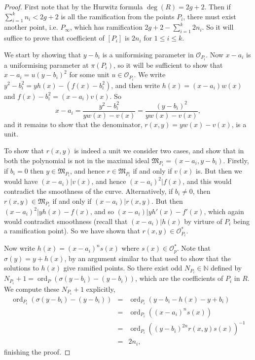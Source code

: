 \documentclass[11pt]{article} %
\theoremstyle{remark}\newtheorem*{rem}{Remark}
\DeclareMathOperator{\ord}{ord}
\begin{document}
\begin{proof}
 First note that by the Hurwitz formula $\deg(R) = 2g+2$.
 Then if $\sum_{i=1}^k n_i < 2g+2$ is all the ramification from the points $P_i$, there must exist another point, i.e. $P_{\infty}$, which has ramification $2g+2-\sum _{i=1}^k2n_i$.
 So it will suffice to prove that coefficient of $[P_i]$ is $2n_i$ for $1\leq i \leq k$.
 
 We start by showing that $y-b_i$ is a uniformising parameter in $\mathscr O_{P_i}$.
 Now $x-a_i$ is a uniformising parameter at $\pi(P_i)$, so it will be sufficient to show that $x-a_i = u(y-b_i)^2$ for some unit $u\in \mathscr O_{P_i}$.
 We write $y^2-b_i^2 = yh(x)-(f(x)-b_i^2)$, and then write $h(x)=(x-a_i)w(x)$ and $f(x)-b_i^2=(x-a_i)v(x)$.
 So 
 \[
x-a_i = \frac{y^2-b_i^2}{yw(x)-v(x)} = \frac{(y-b_i)^2}{yw(x)-v(x)},
 \]
and it remains to show that the denominator, $r(x,y) = yw(x)-v(x)$, is a unit.

To show that $r(x,y)$ is indeed a unit we consider two cases, and show that in both the polynomial is not in the maximal ideal $\mathfrak M_{P_i}=(x-a_i,y-b_i)$.
Firstly, if $b_i=0$ then $y\in \mathfrak{M}_{P_i}$, and hence $r\in \mathfrak M_{P_i}$ if and only if $v(x)$ is.
But then we would have $(x-a_i)|v(x)$, and hence $(x-a_i)^2|f(x)$, and this would contradict the smoothness of the curve.
Alternatively, if $b_i\neq 0$, then $r(x,y)\in \mathfrak M_{P_i}$ if and only if $(x-a_i)|r(x,y)$.
But then $(x-a_i)^2|yh(x)-f(x)$, and so $(x-a_i)|yh'(x)-f'(x)$, which again would contradict smoothness (recall that $(x-a_i)|h(x)$ by virture of $P_i$ being a ramification point).
So we have shown that $r(x,y)\in \mathscr O_{P_i}^*$.

Now write $h(x)=(x-a_i)^ns(x)$ where $s(x)\in \mathscr O_p^*$.
Note that $\sigma (y)=y+h(x)$, by an argument similar to that used to show that the solutions to $h(x)$ give ramified points.
So there exist odd $N_{P_i}\in \mathbb N$ defined by $N_{P_i}+1=\ord_P(\sigma(y - b_i) - (y-b_i))$, which are the coefficients of $P_i$ in $R$.
We compute these $N_{P_i}+1$ explicitly,
\begin{eqnarray*}
 \ord_{P_i}(\sigma(y-b_i)-(y-b_i)) & = & \ord_{P_i}(y-b_i-h(x)-y+b_i)\\
 & = & \ord_{P_i}((x-a_i)^ns(x))\\
 & = & \ord_{P_i}((y-b_i)^{2n}r(x,y)s(x))^{-1}\\
 & = & 2n_i,
\end{eqnarray*}
finishing the proof.
\end{proof}
\end{document}
